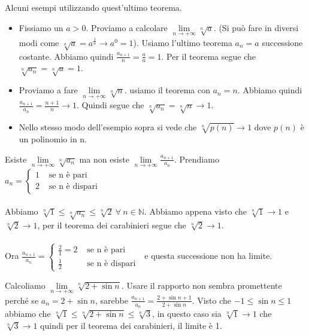 \begin{example}
Alcuni esempi utilizzando quest'ultimo teorema.
\begin{itemize}
    \item Fissiamo un $a > 0$. Proviamo a calcolare $\lim\limits_{n\to +\infty} \sqrt[n]{a}$. (Si può fare in diversi modi come $\sqrt[n]{a} = a^{\frac{1}{n}} \to a^0 = 1$).
    Usiamo l'ultimo teorema $a_n = a$ successione costante. Abbiamo quindi $\frac{a_{n+1}}{n} = \frac{a}{a} = 1$. Per il teorema segue che $\sqrt[n]{a_n} = \sqrt[n]{a} = 1$.
    \item Proviamo a fare $\lim\limits_{n\to +\infty}\sqrt[n]{n}$. usiamo il teorema con $a_n = n$. Abbiamo quindi $\frac{a_{n+1}}{a_n} = \frac{n+1}{n} \to 1$. Quindi segue che $\sqrt[n]{a_n} = \sqrt[n]{n} \to 1$.
    \item Nello stesso modo dell'esempio sopra si vede che $\sqrt[n]{p(n)}\to 1$ dove $p(n)$ è un polinomio in n.
\end{itemize}
\end{example}

\begin{example}
Esiste $\lim\limits_{n\to +\infty}\sqrt[n]{a_n}$ ma non esiste $\lim\limits_{n\to +\infty}\frac{a_{n+1}}{a_n}$.
Prendiamo $a_n = \begin{cases}1 & \text{ se n è pari} \\ 2 & \text{ se n è dispari }\end{cases}$\\\\
Abbiamo $\sqrt[n]{1} \leq \sqrt[n]{a_n} \leq \sqrt[n]{2} \: \forall \: n \in \mathbb{N}$. Abbiamo appena visto che $\sqrt[n]{1} \to 1$ e $\sqrt[n]{2} \to 1$, per il teorema dei carabinieri segue che $\sqrt[n]{2} \to 1$.\\\\
Ora $\frac{a_{n+1}}{a_n} = \begin{cases}\frac{2}{1}=2 & \text{ se n è pari} \\ \frac{1}{2} & \text{ se n è dispari }\end{cases}$ \hspace{.5cm} e questa successione non ha limite.
\end{example}

\begin{example}
Calcoliamo $\lim\limits_{n\to +\infty}\sqrt[n]{2 + \sin{n}}$. Usare il rapporto non sembra promettente perché se $a_n = 2 + \sin{n}$, sarebbe $\frac{a_{n+1}}{a_n} = \frac{2 + \sin{n+1}}{2 + \sin{n}}$. Visto che $-1 \leq \sin{n} \leq 1$ abbiamo che $\sqrt[n]{1} \leq \sqrt[n]{2 + \sin{n}} \leq \sqrt[n]{3}$, in questo caso sia $\sqrt[n]{1} \to 1$ che $\sqrt[n]{3} \to 1$ quindi per il teorema dei carabinieri, il limite è 1.
\end{example}

